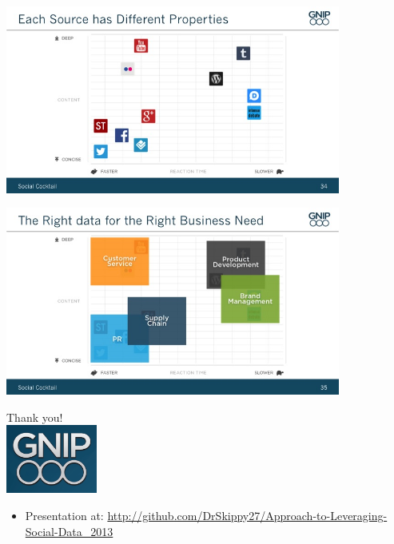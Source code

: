 \documentclass{beamer}
\begin{document}
\begin{frame}
  \begin{center}
    \includegraphics[width=11cm]{./imgs/Slide034.jpg}
  \end{center}
\end{frame}

\begin{frame}
  \begin{center}
    \includegraphics[width=11cm]{./imgs/Slide035.jpg}
  \end{center}
\end{frame}

\begin{frame}
  \begin{center}
    {\Large Thank you!}  \\ [20pt]
    \includegraphics[width=3cm]{./imgs/logo.png} \\ [15pt]
    \begin{itemize}
    \item Presentation at: \url{http://github.com/DrSkippy27/Approach-to-Leveraging-Social-Data_2013}
    \end{itemize}
  \end{center}
\end{frame}
\end{document}
